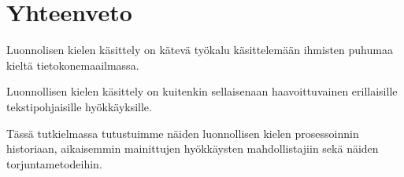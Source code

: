 \chapter{Yhteenveto\label{conclusions}}

Luonnolisen kielen käsittely on kätevä työkalu käsittelemään ihmisten puhumaa kieltä tietokonemaailmassa.

Luonnollisen kielen käsittely on kuitenkin sellaisenaan haavoittuvainen erillaisille tekstipohjaisille hyökkäyksille.

Tässä tutkielmassa tutustuimme näiden luonnollisen kielen prosessoinnin historiaan, aikaisemmin mainittujen hyökkäysten mahdollistajiin sekä näiden torjuntametodeihin.